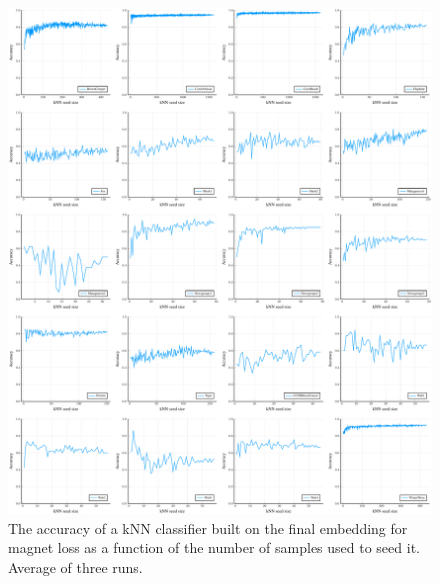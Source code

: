 \begin{figure}[h]
  \centering
  \includegraphics[width=\textwidth]{images/magnet-toy/kNN/magnet-toy-kNN.pdf}
  \caption{The accuracy of a kNN classifier built on the final embedding for magnet loss as a function of the number of samples used to seed it. Average of three runs.}\label{fig:magnet-toy-kNN}
\end{figure}
